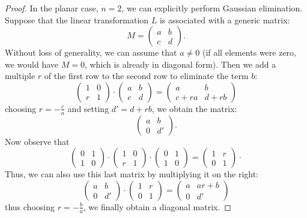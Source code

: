 \begin{proof}
In the planar case, $n=2$, we can explicitly perform Gaussian elimination.
Suppose that the linear transformation $L$ is associated with a generic matrix:
\[
  M = \begin{pmatrix} a&b\\c&d\end{pmatrix}.
\]
Without loss of generality, we can assume that $a\neq 0$ (if all elements were
zero, we would have $M=0$, which is already in diagonal form). Then we add a
multiple $r$ of the first row to the second row to eliminate the term $b$:
\[
\begin{pmatrix} 1&0\\r&1
\end{pmatrix}\cdot
    \begin{pmatrix} a&b\\c&d
    \end{pmatrix}
  =
  \begin{pmatrix} a&b\\c+ra&d+rb
  \end{pmatrix}
\]
choosing $r=-\frac c a$ and setting $d'=d+rb$, we obtain the matrix:
\[
\begin{pmatrix} a&b\\0&d'
\end{pmatrix}.
\]
Now observe that
\[
      \begin{pmatrix} 0&1\\1&0
      \end{pmatrix}\cdot
      \begin{pmatrix} 1&0\\r&1
      \end{pmatrix}\cdot
      \begin{pmatrix} 0&1\\1&0
      \end{pmatrix}
      =
      \begin{pmatrix} 1&r\\0&1
      \end{pmatrix}\cdot
\]
Thus, we can also use this last matrix by multiplying it on the right:
\[
\begin{pmatrix} a&b\\0&d'
\end{pmatrix}\cdot
  \begin{pmatrix} 1&r\\0&1
  \end{pmatrix}
  =
  \begin{pmatrix} a&ar+b\\0&d'
  \end{pmatrix}
\]
thus choosing $r=-\frac b a$, we finally obtain a diagonal matrix.
\end{proof}

